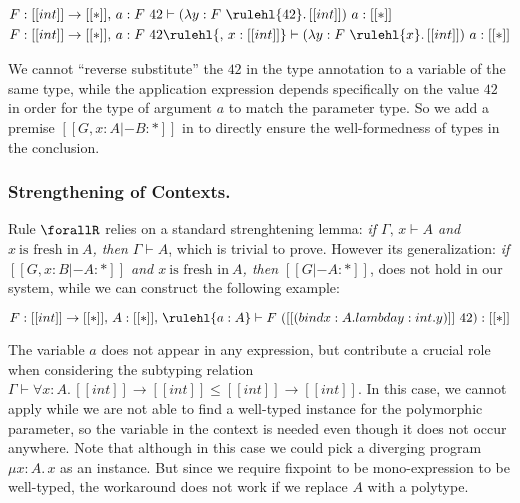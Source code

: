 \begin{align*}
& F : [[int]] \rightarrow [[*]],\, a : F~42  \vdash (\lambda y : F~\rulehl{42}.\, [[int]]) ~ a : [[*]] \\
& F : [[int]] \rightarrow [[*]],\, a : F~42  \rulehl{,\, x : [[int]]} \vdash (\lambda y : F~\rulehl{x}.\, [[int]]) ~ a : [[*]]
\end{align*}

We cannot ``reverse substitute'' the $42$ in the type annotation to a variable
of the same type, while the application expression depends specifically on the value
$42$ in order for the type of argument $a$ to match the parameter type.
So we add a premise $[[G , x : A |- B : *]]$ in  to directly
ensure the well-formedness of types in the conclusion.

\subsubsection{Strengthening of Contexts.}

Rule $\forallR$ relies on a standard strenghtening lemma:
\emph{if $\Gamma,\, x \vdash A$ and $x ~\text{is fresh in}~ A$, then $\Gamma \vdash A$}, which
is trivial to prove.
However its generalization:
\emph{if $[[G, x : B |- A : *]]$ and $x ~\text{is fresh in}~ A$, then $[[G |- A : *]]$},
does not hold in our system, while we can construct the following example:

\begin{equation*}
    F : [[int]] \rightarrow [[*]],\, A : [[*]],\, \rulehl{a : A} \vdash F ~ ([[(bind x : A. lambda y : int. y)]]~ 42) : [[*]]
\end{equation*}

The variable $a$ does not appear in any expression, but contribute a
crucial role when considering the subtyping relation $\Gamma \vdash \forall x : A.\, [[int]] \rightarrow [[int]] \le [[int]] \rightarrow [[int]]$.
In this case, we cannot apply  while we are not able to find a
well-typed instance for the polymorphic parameter, so the variable in the context
is needed even though it does not occur anywhere. Note that although in this
case we could pick a diverging program $\mu x : A.\, x$ as an instance. But
since we require fixpoint to be mono-expression to be well-typed, the workaround
does not work if we replace $A$ with a polytype.

